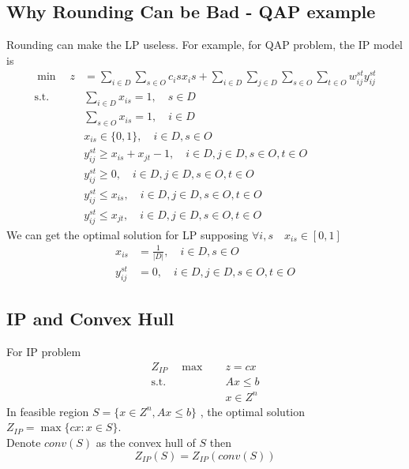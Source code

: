				\subsection{Why Rounding Can be Bad - QAP example}
					Rounding can make the LP useless. For example, for QAP problem, the IP model is
					\begin{align}
						\min \quad z &= \sum_{i\in D} \sum_{s\in O} c_is x_is + \sum_{i\in D} \sum_{j \in D} \sum_{s \in O} \sum_{t\in O} w_{ij}^{st}y_{ij}^{st}  \\
						\text{s.t.} \quad & \sum_{i \in D} x_{is} =1, \quad s\in D  \\
									&\sum_{s \in O} x_{is} = 1, \quad i \in D  \\
									&x_{is} \in \{0, 1\}, \quad i \in D, s\in O  \\
									& y_{ij}^{st} \ge x_{is} + x_{jt} - 1, \quad i\in D, j\in D, s\in O, t \in O  \\
									& y_{ij}^{st} \ge 0, \quad i\in D, j\in D, s\in O, t \in O  \\
									& y_{ij}^{st} \le x_{is}, \quad i\in D, j\in D, s\in O, t \in O  \\
									& y_{ij}^{st} \le x_{jt}, \quad i\in D, j\in D, s\in O, t \in O  
					\end{align}
					We can get the optimal solution for LP supposing $\forall i, s \quad x_{is}\in [0, 1]$
					\begin{align}
						x_{is} &= \frac{1}{|D|}, \quad i \in D, s\in O   \\
						y_{ij}^{st} & = 0, \quad i\in D, j\in D, s\in O, t \in O 
					\end{align}

				\subsection{IP and Convex Hull}
					For IP problem
					\begin{align}
						Z_{IP} \quad \max \quad &z = cx  \\
								\text{s.t.} \quad &Ax \le b \\
										&x\in {Z^n} 
					\end{align}
					In feasible region $S = \{x\in Z^n, Ax\le b\}$ , the optimal solution $Z_{IP} = \max\{cx: x\in S\}$.\\
					Denote $conv(S)$ as the convex hull of $S$ then\\
					\begin{equation}Z_{IP}(S) = Z_{IP}(conv(S))  \end{equation}

